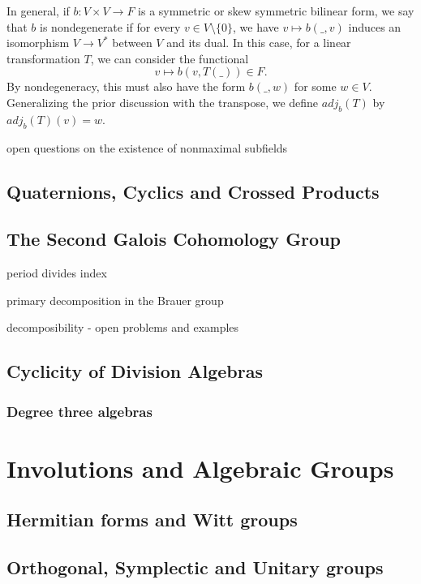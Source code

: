 \documentclass[12pt]{report}
\theoremstyle{plain}
\newcommand{\todo}[1]{\textcolor{todo}{#1}}
\begin{document}
In general, if $b : V \times V \to F$ is a symmetric or skew symmetric
bilinear form, we say that $b$ is nondegenerate if for every $v \in V
\setminus \{0\}$, we have $v \mapsto b(\_, v)$ induces an isomorphism $V
\to V^*$ between $V$ and its dual. In this case, for a linear
transformation $T$, we can consider the functional
\[ v \mapsto b(v, T(\_)) \in F .\]
By nondegeneracy, this must also have the form $b(\_, w)$ for some $w \in
V$. Generalizing the prior discussion with the transpose, we define
$adj_b(T)$ by $adj_b(T)(v) = w$. 

\iffalse

\todo{open questions on the existence of nonmaximal subfields}

\section{Quaternions, Cyclics and Crossed Products}

\section{The Second Galois Cohomology Group}

\todo{period divides index}

\todo{primary decomposition in the Brauer group}

\todo{decomposibility - open problems and examples}

\section{Cyclicity of Division Algebras}

\subsection{Degree three algebras}


\chapter{Involutions and Algebraic Groups}

\section{Hermitian forms and Witt groups}

\section{Orthogonal, Symplectic and Unitary groups}
\end{document}
